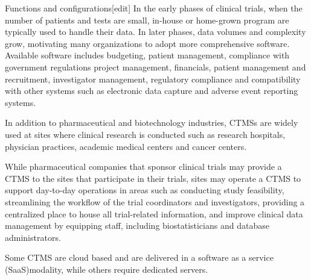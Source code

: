 Functions and configurations[edit]
In the early phases of clinical trials, when the number of patients and tests are small, in-house or home-grown program are typically used to handle their data. In later phases, data volumes and complexity grow, motivating many organizations to adopt more comprehensive software. Available software includes budgeting, patient management, compliance with government regulations project management, financials, patient management and recruitment, investigator management, regulatory compliance and compatibility with other systems such as electronic data capture and adverse event reporting systems.

In addition to pharmaceutical and biotechnology industries, CTMSs are widely used at sites where clinical research is conducted such as research hospitals, physician practices, academic medical centers and cancer centers.

While pharmaceutical companies that sponsor clinical trials may provide a CTMS to the sites that participate in their trials, sites may operate a CTMS to support day-to-day operations in areas such as conducting study feasibility, streamlining the workflow of the trial coordinators and investigators, providing a centralized place to house all trial-related information, and improve clinical data management by equipping staff, including biostatisticians and database administrators.

Some CTMS are cloud based and are delivered in a software as a service (SaaS)modality, while others require dedicated servers.
